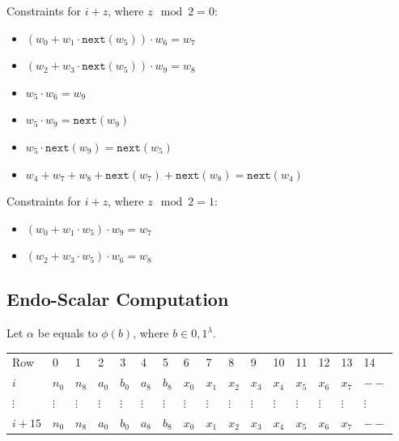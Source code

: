 Constraints for $i + z$, where $z\mod 2 = 0$:
\begin{itemize}
    \item $(w_0 + w_1 \cdot \texttt{next}(w_5)) \cdot w_6 = w_7$
    \item $(w_2 + w_3 \cdot \texttt{next}(w_5)) \cdot w_9 = w_8$
    \item $w_5 \cdot w_6 = w_9$
    \item $w_5 \cdot w_9 = \texttt{next}(w_9)$
    \item $w_5 \cdot \texttt{next}(w_9) = \texttt{next}(w_5)$
    \item $w_4 + w_7 + w_8 + \texttt{next}(w_7) + \texttt{next}(w_8) = \texttt{next}(w_4)$
\end{itemize}

Constraints for $i + z$, where $z\mod 2 = 1$:
\begin{itemize}
    \item $(w_0 + w_1 \cdot w_5) \cdot w_9 = w_7$
    \item $(w_2 + w_3 \cdot w_5) \cdot w_6 = w_8$
\end{itemize}

\subsection{Endo-Scalar Computation}
Let $\alpha$ be equals to $\phi(b)$, where $b \in {0,1}^{\lambda}$.
\begin{center}
    \begin{table}[H]
        \begin{tabular}{llllllllllllllll}
            Row    & 0        & 1        & 2        & 3        & 4        & 5        & 6        & 7        & 8        & 9        & 10       & 11       & 12       & 13       & 14       \\
            $i$   & $n_0$    & $n_8$    & $a_0$    & $b_0$    & $a_8$    & $b_8$    & $x_0$      & $x_1$    & $x_2$    & $x_3$    & $x_4$    & $x_5$    & $x_6$ & $x_7$ & $--$ \\
            $\vdots$ & $\vdots$ & $\vdots$ & $\vdots$ & $\vdots$ & $\vdots$ & $\vdots$ & $\vdots$ & $\vdots$ & $\vdots$ & $\vdots$ & $\vdots$ & $\vdots$ & $\vdots$ & $\vdots$ & $\vdots$ \\
            $i + 15$   & $n_0$    & $n_8$    & $a_0$    & $b_0$    & $a_8$    & $b_8$    & $x_0$      & $x_1$    & $x_2$    & $x_3$    & $x_4$    & $x_5$    & $x_6$ & $x_7$ & $--$ \\
        \end{tabular}
    \end{table}
\end{center}

